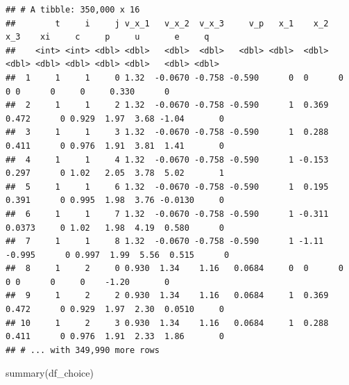 \documentclass[
]{book}
\newenvironment{Shaded}{\begin{snugshade}}{\end{snugshade}}
\newcommand{\FunctionTok}[1]{\textcolor[rgb]{0.00,0.00,0.00}{#1}}
\newcommand{\NormalTok}[1]{#1}
\begin{document}
\begin{verbatim}
## # A tibble: 350,000 x 16
##        t     i     j v_x_1   v_x_2  v_x_3     v_p   x_1    x_2     x_3    xi     c     p     u       e     q
##    <int> <int> <dbl> <dbl>   <dbl>  <dbl>   <dbl> <dbl>  <dbl>   <dbl> <dbl> <dbl> <dbl> <dbl>   <dbl> <dbl>
##  1     1     1     0 1.32  -0.0670 -0.758 -0.590      0  0      0          0 0      0     0     0.330      0
##  2     1     1     2 1.32  -0.0670 -0.758 -0.590      1  0.369  0.472      0 0.929  1.97  3.68 -1.04       0
##  3     1     1     3 1.32  -0.0670 -0.758 -0.590      1  0.288  0.411      0 0.976  1.91  3.81  1.41       0
##  4     1     1     4 1.32  -0.0670 -0.758 -0.590      1 -0.153  0.297      0 1.02   2.05  3.78  5.02       1
##  5     1     1     6 1.32  -0.0670 -0.758 -0.590      1  0.195  0.391      0 0.995  1.98  3.76 -0.0130     0
##  6     1     1     7 1.32  -0.0670 -0.758 -0.590      1 -0.311  0.0373     0 1.02   1.98  4.19  0.580      0
##  7     1     1     8 1.32  -0.0670 -0.758 -0.590      1 -1.11  -0.995      0 0.997  1.99  5.56  0.515      0
##  8     1     2     0 0.930  1.34    1.16   0.0684     0  0      0          0 0      0     0    -1.20       0
##  9     1     2     2 0.930  1.34    1.16   0.0684     1  0.369  0.472      0 0.929  1.97  2.30  0.0510     0
## 10     1     2     3 0.930  1.34    1.16   0.0684     1  0.288  0.411      0 0.976  1.91  2.33  1.86       0
## # ... with 349,990 more rows
\end{verbatim}

\begin{Shaded}
\begin{Highlighting}[]
\FunctionTok{summary}\NormalTok{(df\_choice)}
\end{Highlighting}
\end{Shaded}
\end{document}
